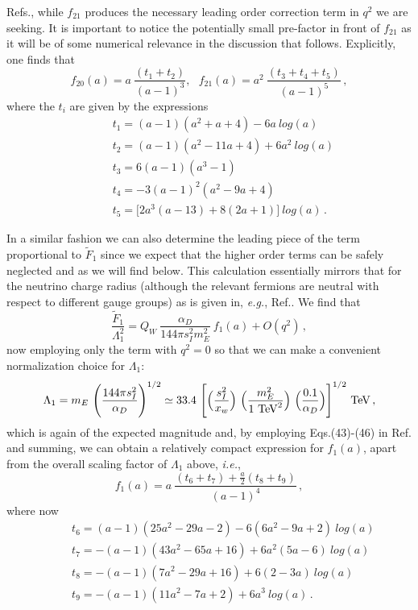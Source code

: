 \documentclass[14pt]{article}
\def\ie{{\it i.e.}}
\def\eg{{\it e.g.}}
\begin{document}
{Refs.\cite{Leveille:1977rc,Yu:2021suw,Bolanos-Carrera:2023ppu}, while 
$f_{21}$ produces the necessary leading order correction term in $q^2$ we are seeking. It is important to notice the potentially small pre-factor in front of $f_{21}$ as it will be of some numerical 
relevance in the discussion that follows. Explicitly, one finds that 
%
\begin{equation}
f_{20}(a)=a~\frac{(t_1+t_2)}{(a-1)^3},~~~f_{21}(a)=a^2~\frac{(t_3+t_4+t_5)}{(a-1)^5}\,,
\end{equation}
%
where the $t_i$ are given by the expressions
%
\begin{eqnarray}
&~~~~&t_1=(a-1)(a^2+a+4)-6a~log(a)\nonumber\\
&~~~~&t_2=(a-1)(a^2-11a+4)+6a^2~log(a)\nonumber\\
&~~~~&t_3=6(a-1)(a^3-1)\nonumber\\
&~~~~&t_4=-3(a-1)^2(a^2-9a+4)\nonumber\\
&~~~~&t_5=\big[2a^3(a-13)+8(2a+1)\big]~log(a)\,.
 \end{eqnarray} 
%

In a similar fashion we can also determine the leading piece of the term proportional to $\tilde F_1$ since we expect that the higher order terms can be safely neglected and as we will find below. 
This calculation essentially mirrors that for the neutrino charge radius (although the relevant fermions are neutral with respect to different gauge groups) as is given in, \eg, 
Ref.\cite{Bolanos-Carrera:2023ppu}. We find that
%
\begin{equation}
\frac{\tilde F_1}{\Lambda_1^2}=Q_W~\frac{\alpha_D}{144\pi s_I^2 m_E^2}~f_1(a)+O(q^2)\,,
\end{equation}
%
now employing only the term with $q^2=0$ so that we can make a convenient normalization choice for $\Lambda_1$: 
%
\begin{equation}
\Lambda_1 =m_E~ \Bigg(\frac{144 \pi s_I^2}{\alpha_D}\Bigg)^{1/2} \simeq 33.4 ~\Bigg[ \Big(\frac{s_I^2}{x_w}\Big)~\Big(\frac{m_E^2}{\rm {1~TeV}^2}\Big)~ \Big(\frac{0.1}{\alpha_D}\Big) \Bigg]^{1/2}~ {\rm {TeV}}\,,
\end{equation}
%
which is again of the expected magnitude and, by employing Eqs.(43)-(46) in Ref.\cite{Bolanos-Carrera:2023ppu} and summing, we can obtain a relatively compact expression for $f_1(a)$, apart 
from the overall scaling factor of $\Lambda_1$ above, \ie, 
%
\begin{equation}
f_1(a)=a~\frac{(t_6+t_7)+\frac{a}{2}(t_8+t_9)}{(a-1)^4}\,,
\end{equation}
%
where now 
%
\begin{eqnarray}
&~~~~&t_6=(a-1)(25a^2-29a-2)-6(6a^2-9a+2)~log(a)\nonumber\\
&~~~~&t_7=-(a-1)(43a^2-65a+16)+6a^2(5a-6)~log(a)\nonumber\\
&~~~~&t_8=-(a-1)(7a^2-29a+16)+6(2-3a)~log(a)\nonumber\\
&~~~~&t_9=-(a-1)(11a^2-7a+2)+6a^3~log(a)\,.
 \end{eqnarray} 
%

}
\end{document}
